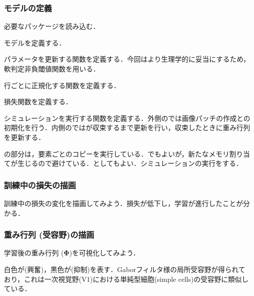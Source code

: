 \subsubsection{モデルの定義}
必要なパッケージを読み込む．

モデルを定義する．

パラメータを更新する関数を定義する．今回はより生理学的に妥当にするため，軟判定非負閾値関数を用いる．

行ごとに正規化する関数を定義する．

損失関数を定義する．

シミュレーションを実行する関数を定義する．外側のでは画像パッチの作成との初期化を行う．内側のではが収束するまで更新を行い，収束したときに重み行列を更新する．

の部分は，要素ごとのコピーを実行している．でもよいが，新たなメモリ割り当てが生じるので避けている．としてもよい．シミュレーションの実行をする．

\subsubsection{訓練中の損失の描画}
訓練中の損失の変化を描画してみよう．損失が低下し，学習が進行したことが分かる．


\subsubsection{重み行列 (受容野)の描画}
学習後の重み行列  ($\mathbf{\Phi}$)を可視化してみよう．


白色が\textbf{}(興奮)，黒色が\textbf{}(抑制)を表す．Gaborフィルタ様の局所受容野が得られており，これは一次視覚野(V1)における単純型細胞(simple cells)の受容野に類似している．

